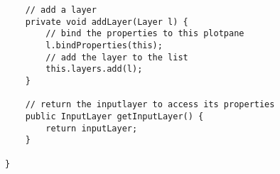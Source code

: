 \documentclass[../../../../main.tex]{subfiles}
\begin{document}
\begin{verbatim}
	// add a layer
	private void addLayer(Layer l) {
		// bind the properties to this plotpane
		l.bindProperties(this);
		// add the layer to the list
		this.layers.add(l);
	}

	// return the inputlayer to access its properties
	public InputLayer getInputLayer() {
		return inputLayer;
	}

}

\end{verbatim}

\newpage
\end{document}
